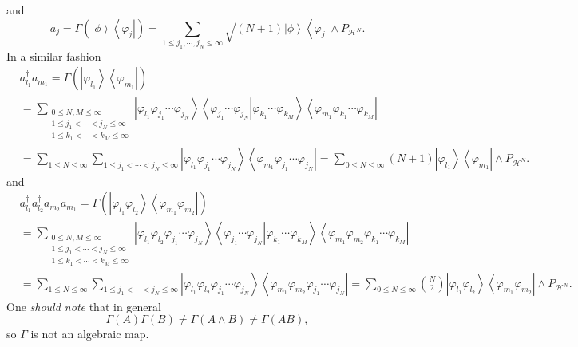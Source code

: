 \documentclass[aps,preprint,amsfonts,amssymb,showpacs,showkeys]{revtex4}%
\begin{document}
and%
\begin{equation}
a_{j}=\Gamma\left(  \left\vert \phi\right\rangle \left\langle \varphi
_{j}\right\vert \right)  =\sum_{1\leq j_{1},\cdots,j_{N}\leq\infty}%
\sqrt{\left(  N+1\right)  }\left\vert \phi\right\rangle \left\langle
\varphi_{j}\right\vert \wedge P_{\mathcal{H}^{N}}.\nonumber
\end{equation}
In a similar fashion
\begin{align}
&  a_{l_{1}}^{\dagger}a_{m_{1}}=\Gamma\left(  \left\vert \varphi_{l_{1}%
}\right\rangle \left\langle \varphi_{m_{1}}\right\vert \right) \nonumber\\
&  =\sum_{\substack{0\leq N,M\leq\infty\\1\leq j_{1}<\cdots<j_{N}\leq
\infty\\1\leq k_{1}<\cdots<k_{M}\leq\infty}}\left\vert \varphi_{l_{1}}%
\varphi_{j_{1}}\cdots\varphi_{j_{N}}\right\rangle \left\langle \left.
\varphi_{j_{1}}\cdots\varphi_{j_{N}}\right\vert \varphi_{k_{1}}\cdots
\varphi_{k_{M}}\right\rangle \left\langle \varphi_{m_{1}}\varphi_{k_{1}}%
\cdots\varphi_{k_{M}}\right\vert \nonumber\\
&  =\sum_{1\leq N\leq\infty}\sum_{1\leq j_{1}<\cdots<j_{N}\leq\infty
}\left\vert \varphi_{l_{1}}\varphi_{j_{1}}\cdots\varphi_{j_{N}}\right\rangle
\left\langle \varphi_{m_{1}}\varphi_{j_{1}}\cdots\varphi_{j_{N}}\right\vert
=\sum_{0\leq N\leq\infty}\left(  N+1\right)  \left\vert \varphi_{l_{1}%
}\right\rangle \left\langle \varphi_{m_{1}}\right\vert \wedge P_{\mathcal{H}%
^{N}}.
\end{align}
and%
\begin{align}
&  a_{l_{1}}^{\dagger}a_{l_{2}}^{\dagger}a_{m_{2}}a_{m_{1}}=\Gamma\left(
\left\vert \varphi_{l_{1}}\varphi_{l_{2}}\right\rangle \left\langle
\varphi_{m_{1}}\varphi_{m_{2}}\right\vert \right) \nonumber\\
&  =\sum_{\substack{0\leq N,M\leq\infty\\1\leq j_{1}<\cdots<j_{N}\leq
\infty\\1\leq k_{1}<\cdots<k_{M}\leq\infty}}\left\vert \varphi_{l_{1}}%
\varphi_{l_{2}}\varphi_{j_{1}}\cdots\varphi_{j_{N}}\right\rangle \left\langle
\left.  \varphi_{j_{1}}\cdots\varphi_{j_{N}}\right\vert \varphi_{k_{1}}%
\cdots\varphi_{k_{M}}\right\rangle \left\langle \varphi_{m_{1}}\varphi_{m_{2}%
}\varphi_{k_{1}}\cdots\varphi_{k_{M}}\right\vert \nonumber\\
&  =\sum_{1\leq N\leq\infty}\sum_{1\leq j_{1}<\cdots<j_{N}\leq\infty
}\left\vert \varphi_{l_{1}}\varphi_{l_{2}}\varphi_{j_{1}}\cdots\varphi_{j_{N}%
}\right\rangle \left\langle \varphi_{m_{1}}\varphi_{m_{2}}\varphi_{j_{1}%
}\cdots\varphi_{j_{N}}\right\vert =\sum_{0\leq N\leq\infty}\binom{N}%
{2}\left\vert \varphi_{l_{1}}\varphi_{l_{2}}\right\rangle \left\langle
\varphi_{m_{1}}\varphi_{m_{2}}\right\vert \wedge P_{\mathcal{H}^{N}}.
\end{align}
One \emph{should note} that in general
\begin{equation}
\Gamma\left(  A\right)  \Gamma\left(  B\right)  \neq\Gamma\left(  A\wedge
B\right)  \neq\Gamma\left(  AB\right)  ,
\end{equation}
so $\Gamma$ is not an algebraic map.
\end{document}
